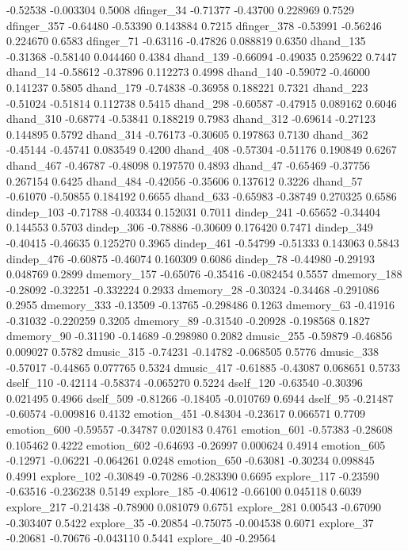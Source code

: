\documentclass[10pt, letterpaper]{article}
\begin{document}
-0.52538 -0.003304 0.5008 dfinger\_34 -0.71377 -0.43700 0.228969 0.7529
dfinger\_357 -0.64480 -0.53390 0.143884 0.7215 dfinger\_378 -0.53991
-0.56246 0.224670 0.6583 dfinger\_71 -0.63116 -0.47826 0.088819 0.6350
dhand\_135 -0.31368 -0.58140 0.044460 0.4384 dhand\_139 -0.66094
-0.49035 0.259622 0.7447 dhand\_14 -0.58612 -0.37896 0.112273 0.4998
dhand\_140 -0.59072 -0.46000 0.141237 0.5805 dhand\_179 -0.74838
-0.36958 0.188221 0.7321 dhand\_223 -0.51024 -0.51814 0.112738 0.5415
dhand\_298 -0.60587 -0.47915 0.089162 0.6046 dhand\_310 -0.68774
-0.53841 0.188219 0.7983 dhand\_312 -0.69614 -0.27123 0.144895 0.5792
dhand\_314 -0.76173 -0.30605 0.197863 0.7130 dhand\_362 -0.45144
-0.45741 0.083549 0.4200 dhand\_408 -0.57304 -0.51176 0.190849 0.6267
dhand\_467 -0.46787 -0.48098 0.197570 0.4893 dhand\_47 -0.65469 -0.37756
0.267154 0.6425 dhand\_484 -0.42056 -0.35606 0.137612 0.3226 dhand\_57
-0.61070 -0.50855 0.184192 0.6655 dhand\_633 -0.65983 -0.38749 0.270325
0.6586 dindep\_103 -0.71788 -0.40334 0.152031 0.7011 dindep\_241
-0.65652 -0.34404 0.144553 0.5703 dindep\_306 -0.78886 -0.30609 0.176420
0.7471 dindep\_349 -0.40415 -0.46635 0.125270 0.3965 dindep\_461
-0.54799 -0.51333 0.143063 0.5843 dindep\_476 -0.60875 -0.46074 0.160309
0.6086 dindep\_78 -0.44980 -0.29193 0.048769 0.2899 dmemory\_157
-0.65076 -0.35416 -0.082454 0.5557 dmemory\_188 -0.28092 -0.32251
-0.332224 0.2933 dmemory\_28 -0.30324 -0.34468 -0.291086 0.2955
dmemory\_333 -0.13509 -0.13765 -0.298486 0.1263 dmemory\_63 -0.41916
-0.31032 -0.220259 0.3205 dmemory\_89 -0.31540 -0.20928 -0.198568 0.1827
dmemory\_90 -0.31190 -0.14689 -0.298980 0.2082 dmusic\_255 -0.59879
-0.46856 0.009027 0.5782 dmusic\_315 -0.74231 -0.14782 -0.068505 0.5776
dmusic\_338 -0.57017 -0.44865 0.077765 0.5324 dmusic\_417 -0.61885
-0.43087 0.068651 0.5733 dself\_110 -0.42114 -0.58374 -0.065270 0.5224
dself\_120 -0.63540 -0.30396 0.021495 0.4966 dself\_509 -0.81266
-0.18405 -0.010769 0.6944 dself\_95 -0.21487 -0.60574 -0.009816 0.4132
emotion\_451 -0.84304 -0.23617 0.066571 0.7709 emotion\_600 -0.59557
-0.34787 0.020183 0.4761 emotion\_601 -0.57383 -0.28608 0.105462 0.4222
emotion\_602 -0.64693 -0.26997 0.000624 0.4914 emotion\_605 -0.12971
-0.06221 -0.064261 0.0248 emotion\_650 -0.63081 -0.30234 0.098845 0.4991
explore\_102 -0.30849 -0.70286 -0.283390 0.6695 explore\_117 -0.23590
-0.63516 -0.236238 0.5149 explore\_185 -0.40612 -0.66100 0.045118 0.6039
explore\_217 -0.21438 -0.78900 0.081079 0.6751 explore\_281 0.00543
-0.67090 -0.303407 0.5422 explore\_35 -0.20854 -0.75075 -0.004538 0.6071
explore\_37 -0.20681 -0.70676 -0.043110 0.5441 explore\_40 -0.29564
\end{document}
